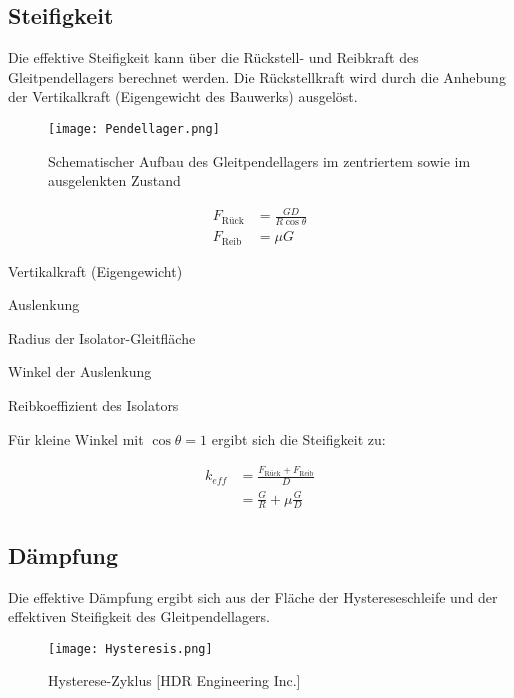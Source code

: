 \pagebreak

\subsection{Steifigkeit}
\label{sec:steifigkeit}

Die effektive Steifigkeit kann über die Rückstell- und Reibkraft des Gleitpendellagers berechnet werden. Die Rückstellkraft wird durch die Anhebung der Vertikalkraft (Eigengewicht des Bauwerks) ausgelöst. \cite{Pocanschi}

\begin{figure}[H]
    \centering
    \texttt{[image: Pendellager.png]}
    \caption{Schematischer Aufbau des Gleitpendellagers im zentriertem sowie im ausgelenkten Zustand \cite{Romen}}
\end{figure}

\begin{align*}
F_{\text{Rück}} &= \frac{G D}{R \cos \theta}\\
F_{\text{Reib}} &= \mu G
\end{align*}

  Vertikalkraft (Eigengewicht)\par
{}  Auslenkung\par
{}  Radius der Isolator-Gleitfläche\par
\makebox[0.8cm]{$\theta$}  Winkel der Auslenkung\par
\makebox[0.8cm]{$\mu$}  Reibkoeffizient des Isolators\par

Für kleine Winkel mit $\cos \theta = 1$ ergibt sich die Steifigkeit zu:

\begin{align}
k_{eff} &= \frac{F_{\text{Rück}} + F_{\text{Reib}}}{D}\nonumber\\
        &= \frac{G}{R} + \mu \frac{G}{D}\label{keff}
\end{align}

\pagebreak

\subsection{Dämpfung}
\label{sec:daempdung}

Die effektive Dämpfung ergibt sich aus der Fläche der Hystereseschleife und der effektiven Steifigkeit des Gleitpendellagers. \cite{Huber}\cite{Pocanschi}

\begin{figure}[h]
    \centering
    \texttt{[image: Hysteresis.png]}
    \caption{Hysterese-Zyklus [HDR Engineering Inc.]}
\end{figure}

